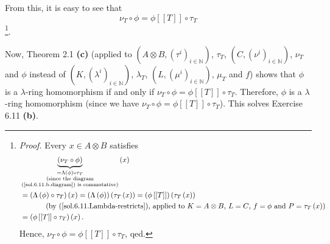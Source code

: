 \documentclass[numbers=enddot,12pt,final,onecolumn,notitlepage]{scrartcl}%
\begin{document}
From this, it is easy to see that%
\[
\nu_{T}\circ\phi=\phi\left[  \left[  T\right]  \right]  \circ\tau_{T}%
\]
\footnote{\textit{Proof.} Every $x\in A\otimes B$ satisfies%
\begin{align*}
&  \underbrace{\left(  \nu_{T}\circ\phi\right)  }_{\substack{=\Lambda\left(
\phi\right)  \circ\tau_{T}\\\text{(since the diagram}%
\\\text{(\ref{sol.6.11.b.diagram}) is commutative)}}}\left(  x\right) \\
&  =\left(  \Lambda\left(  \phi\right)  \circ\tau_{T}\right)  \left(
x\right)  =\left(  \Lambda\left(  \phi\right)  \right)  \left(  \tau
_{T}\left(  x\right)  \right)  =\left(  \phi\left[  \left[  T\right]  \right]
\right)  \left(  \tau_{T}\left(  x\right)  \right) \\
&  \ \ \ \ \ \ \ \ \ \ \left(  \text{by (\ref{sol.6.11.Lambda-restricts}),
applied to }K=A\otimes B\text{, }L=C\text{, }f=\phi\text{ and }P=\tau
_{T}\left(  x\right)  \right) \\
&  =\left(  \phi\left[  \left[  T\right]  \right]  \circ\tau_{T}\right)
\left(  x\right)  .
\end{align*}
Hence, $\nu_{T}\circ\phi=\phi\left[  \left[  T\right]  \right]  \circ\tau_{T}%
$, qed.}.

Now, Theorem 2.1 \textbf{(c)} (applied to $\left(  A\otimes B,\left(  \tau
^{i}\right)  _{i\in\mathbb{N}}\right)  $, $\tau_{T}$, $\left(  C,\left(
\nu^{i}\right)  _{i\in\mathbb{N}}\right)  $, $\nu_{T}$ and $\phi$ instead of
$\left(  K,\left(  \lambda^{i}\right)  _{i\in\mathbb{N}}\right)  $,
$\lambda_{T}$, $\left(  L,\left(  \mu^{i}\right)  _{i\in\mathbb{N}}\right)  $,
$\mu_{T}$ and $f$) shows that $\phi$ is a $\lambda$-ring homomorphism if and
only if $\nu_{T}\circ\phi=\phi\left[  \left[  T\right]  \right]  \circ\tau
_{T}$. Therefore, $\phi$ is a $\lambda$-ring homomorphism (since we have
$\nu_{T}\circ\phi=\phi\left[  \left[  T\right]  \right]  \circ\tau_{T}$). This
solves Exercise 6.11 \textbf{(b)}.
\end{document}
